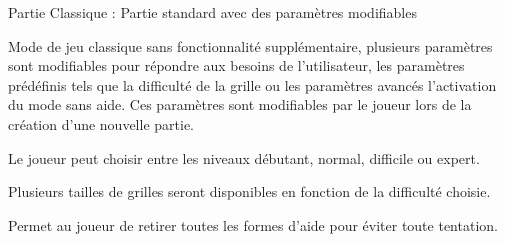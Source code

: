 {
        Partie Classique : Partie standard avec des paramètres modifiables
}
{
    Mode de jeu classique sans fonctionnalité supplémentaire, plusieurs paramètres sont modifiables pour répondre aux besoins de l'utilisateur, les paramètres prédéfinis tels que la difficulté de la grille ou les paramètres avancés l'activation du mode sans aide. Ces paramètres sont modifiables par le joueur lors de la création d'une nouvelle partie.
    \noexpand\begin{description}
        \noexpand\item[Difficulté :]
            Le joueur peut choisir entre les niveaux débutant, normal, difficile ou expert.
        \noexpand\item[Taille de la grille :]
            Plusieurs tailles de grilles seront disponibles en fonction de la difficulté choisie.
        \noexpand\item[Mode sans aide :] 
            Permet au joueur de retirer toutes les formes d'aide pour éviter toute tentation.
        \noexpand\end{description}
}